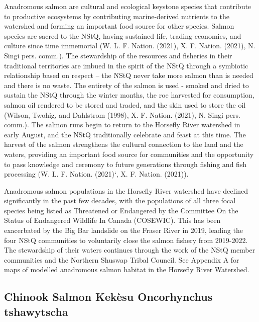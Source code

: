 \documentclass[
  letterpaper,
  DIV=11,
  numbers=noendperiod]{scrreprt}
\begin{document}
Anadromous salmon are cultural and ecological keystone species that
contribute to productive ecosystems by contributing marine-derived
nutrients to the watershed and forming an important food source for
other species. Salmon species are sacred to the NStQ, having sustained
life, trading economies, and culture since time immemorial (W. L. F.
Nation. (2021), X. F. Nation. (2021), N. Singi pers. comm.). The
stewardship of the resources and fisheries in their traditional
territories are imbued in the spirit of the NStQ through a symbiotic
relationship based on respect -- the NStQ never take more salmon than is
needed and there is no waste. The entirety of the salmon is used -
smoked and dried to sustain the NStQ through the winter months, the roe
harvested for consumption, salmon oil rendered to be stored and traded,
and the skin used to store the oil (Wilson, Twohig, and Dahlstrom
(1998), X. F. Nation. (2021), N. Singi pers. comm.). The salmon runs
begin to return to the Horsefly River watershed in early August, and the
NStQ traditionally celebrate and feast at this time. The harvest of the
salmon strengthens the cultural connection to the land and the waters,
providing an important food source for communities and the opportunity
to pass knowledge and ceremony to future generations through fishing and
fish processing (W. L. F. Nation. (2021)`, X. F. Nation. (2021)).

Anadromous salmon populations in the Horsefly River watershed have
declined significantly in the past few decades, with the populations of
all three focal species being listed as Threatened or Endangered by the
Committee On the Status of Endangered Wildlife In Canada (COSEWIC). This
has been exacerbated by the Big Bar landslide on the Fraser River in
2019, leading the four NStQ communities to voluntarily close the salmon
fishery from 2019-2022. The stewardship of their waters continues
through the work of the NStQ member communities and the Northern Shuswap
Tribal Council. See Appendix A for maps of modelled anadromous salmon
habitat in the Horsefly River Watershed.

\hypertarget{chinook-salmon-kekuxe8su-oncorhynchus-tshawytscha}{%
\subsection*{Chinook Salmon \textbar{} Kekèsu \textbar{} Oncorhynchus
tshawytscha}\label{chinook-salmon-kekuxe8su-oncorhynchus-tshawytscha}}
\end{document}
